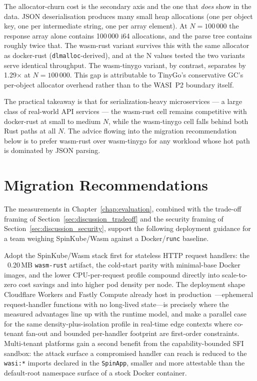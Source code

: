 \begin{sloppypar}
The allocator-churn cost is the secondary axis and the one that \emph{does} show in the data. \acs{JSON} deserialisation produces many small heap allocations (one per object key, one per intermediate string, one per array element). At $N=100\,000$ the response array alone contains 100\,000 i64 allocations, and the parse tree contains roughly twice that. The wasm-rust variant survives this with the same allocator as docker-rust (\texttt{dlmalloc}-derived), and at the N values tested the two variants serve identical throughput. The wasm-tinygo variant, by contrast, separates by 1.29$\times$ at $N=100\,000$. This gap is attributable to TinyGo's conservative \acs{GC}'s per-object allocator overhead rather than to the \acs{WASI}~P2 boundary itself.
\end{sloppypar}

The practical takeaway is that for serialization-heavy microservices --- a large class of real-world API services --- the wasm-rust cell remains competitive with docker-rust at small to medium $N$, while the wasm-tinygo cell falls behind both Rust paths at all $N$. The advice flowing into the migration recommendation below is to prefer wasm-rust over wasm-tinygo for any workload whose hot path is dominated by JSON parsing.

\section{Migration Recommendations}
\label{sec:discussion_migration}

\begin{sloppypar}
The measurements in Chapter~\ref{chap:evaluation}, combined with the trade-off framing of Section~\ref{sec:discussion_tradeoff} and the security framing of Section~\ref{sec:discussion_security}, support the following deployment guidance for a team weighing SpinKube/\acs{Wasm} against a Docker/\texttt{runc} baseline.
\end{sloppypar}

\begin{sloppypar}
Adopt the SpinKube/\acs{Wasm} stack first for stateless \acs{HTTP} request handlers: the ~0.20\,MB \texttt{wasm-rust} artifact, the cold-start parity with minimal-base Docker images, and the lower \acs{CPU}-per-request profile compound directly into scale-to-zero cost savings and into higher pod density per node. The deployment shape Cloudflare Workers and Fastly Compute already host in production~\cite{cloudflare2024workers, fastly2024compute}---ephemeral request-handler functions with no long-lived state---is precisely where the measured advantages line up with the runtime model, and \textcite{kadusale2024rtwasm} make a parallel case for the same density-plus-isolation profile in real-time edge contexts where co-tenant fan-out and bounded per-handler footprint are first-order constraints. Multi-tenant platforms gain a second benefit from the capability-bounded \acs{SFI} sandbox: the attack surface a compromised handler can reach is reduced to the \texttt{wasi:*} imports declared in the \texttt{SpinApp}, smaller and more attestable than the default-root namespace surface of a stock Docker container.
\end{sloppypar}

